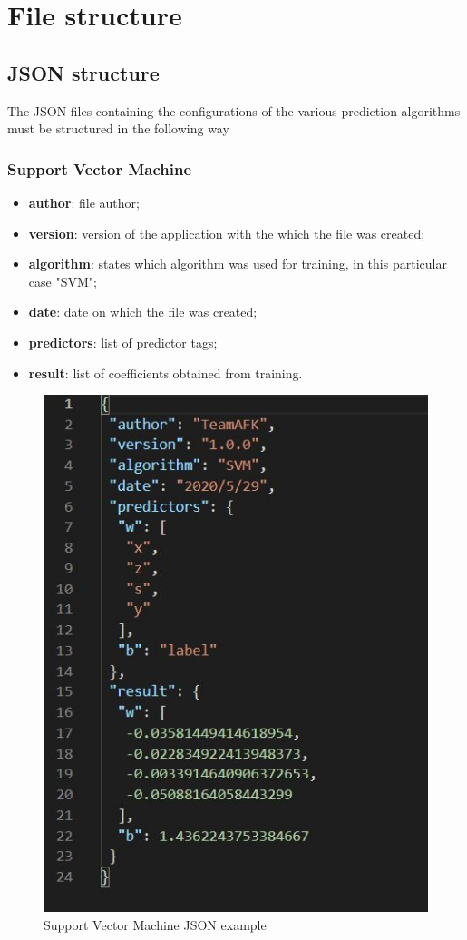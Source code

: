\section{File structure}
\subsection{JSON structure}
The JSON files containing the configurations of the various prediction algorithms must be structured in the following way

\subsubsection{Support Vector Machine}
\begin{itemize}
	\item \textbf{author}: file author;
	\item \textbf{version}: version of the application with the which the file was created;
	\item \textbf{algorithm}: states which algorithm was used for training, in this particular case "SVM";
	\item \textbf{date}: date on which the file was created;
	\item \textbf{predictors}: list of predictor tags;
	\item \textbf{result}: list of coefficients obtained from training.
\end{itemize}
\begin{figure}[H]
\centering
\includegraphics[scale=0.65]{img/json/jsonSVM.png}
\caption{Support Vector Machine JSON example}
\end{figure}
\newpage

